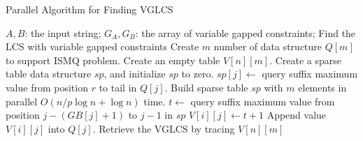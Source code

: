 \begin{algorithm*}[!thb]
  \caption{Parallel Algorithm for Finding VGLCS}
  \label{alg:parallel-VGLCS}
  \begin{algorithmic}[1]
    \Require
      $A, B$: the input string;
      $G_A, G_B$: the array of variable gapped constraints;
    \Ensure Find the LCS with variable gapped constraints
    \State Create $m$ number of data structure $Q[m]$ to support ISMQ problem.
    \State Create an empty table $V[n][m]$.
      \State Create a sparse table data structure $\textit{sp}$, and initialize $\textit{sp}$ to zero.
        \State $\textit{sp}[j] \gets$ query suffix maximum value from position $r$ to tail in $Q[j]$.
      \EndParFor
      \State Build sparse table $\textit{sp}$ with $m$ elements in parallel $O(n/p \log n + \log n)$ time.
            \State $t \gets $ query suffix maximum value from position $j - (GB[j] + 1)$ to $j-1$ in $\textit{sp}$
            \State $V[i][j] \gets t + 1$
            \State Append value $V[i][j]$ into $Q[j]$.
        \EndIf
      \EndParFor
    \EndFor
    \State Retrieve the VGLCS by tracing $V[n][m]$
  \end{algorithmic}
\end{algorithm*}